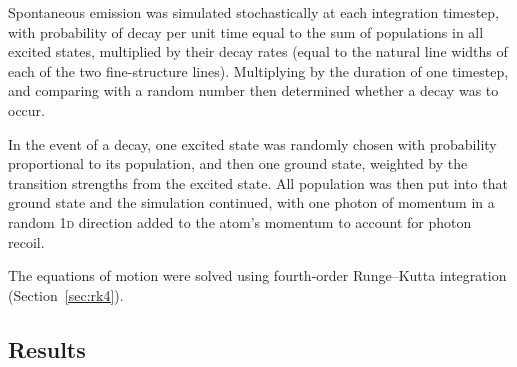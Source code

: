 Spontaneous emission was simulated stochastically at each integration timestep, with probability of decay per unit time equal to the sum of populations in all excited states, multiplied by their decay rates (equal to the natural line widths of each of the two fine-structure lines). Multiplying by the duration of one timestep, and comparing with a random number then determined whether a decay was to occur.

In the event of a decay, one excited state was randomly chosen with probability proportional to its population, and then one ground state, weighted by the transition strengths from the excited state. All population was then put into that ground state and the simulation continued, with one photon of momentum in a random \textsc{1d} direction added to the atom's momentum to account for photon recoil.

The equations of motion were solved using fourth-order Runge--Kutta integration (Section~\ref{sec:rk4}).

\subsection{Results}

\begin{table}
    \renewcommand{\arraystretch}{1.5}
    \setlength\heavyrulewidth{1.5pt}
    \caption{The parameters used in the laser cooling simulations. There are four lasers, each with a specified polarisation, intensity, and detuning from the transition it targets.}\label{table:numbers}
\end{table}

